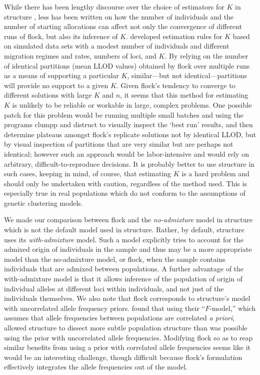 While there has been lengthy 
discourse over the choice of estimators for $K$ in {\sc structure} 
\citep{Pritchardetal2000,Evannoetal2005,Wap&Gag2006,Gaoetal2011}, less has been written on how the number of 
individuals
and the number of starting allocations can affect not only the convergence of different runs of {\sc flock}, but also its 
inference of $K$. \citeauthor{Duc&Tur2012} developed estimation rules for $K$ based on simulated data 
sets with a modest number of individuals and different migration regimes and rates, numbers of loci, and $K$. 
By relying on the number of identical partitions (mean LLOD values) obtained by {\sc flock} over multiple
runs as a means of supporting 
a particular $K$,  similar---but not identical---partitions
will provide no support to a given $K$. Given {\sc flock}'s tendency to converge to 
different solutions with large $K$ and $n$, it seems that 
this method for estimating $K$ is unlikely to be reliable or workable in large, complex
problems.  One possible patch for this problem would be running
multiple small batches and using the programs {\sc clumpp} \citep{Jak&Ros2007} and
{\sc distruct} \citep{Rosenberg2004} to visually inspect the `best run' results, and then 
determine plateaus amongst {\sc flock}'s replicate solutions not by identical LLOD, but by visual inspection of 
partitions that
are very similar but are perhaps not identical; however such an approach would be labor-intensive
and would rely on arbitrary, difficult-to-reproduce decisions.  It is probably better to use {\sc structure} in such cases, keeping in mind, of course, that
estimating $K$ is a hard problem and should only be undertaken with caution, regardless of the method 
used. This is especially true in real populations which do not conform to the assumptions of genetic clustering models.


We made our comparison between {\sc flock} and the {\em no-admixture} model in 
{\sc structure} which is not the default model used in {\sc structure}. Rather, by default, {\sc structure} uses 
its {\em with-admixture} model.  Such a model explicitly tries to account for the admixed origin
of individuals in the sample and thus may be a more appropriate model than the no-admixture model,
or {\sc flock}, when the sample contains individuals that are admixed between populations.  A further advantage
of the with-admixture model is that it allows inference of the population of origin of individual alleles at 
different loci within individuals, and not just of the individuals themselves.   We also note that {\sc flock} 
corresponds to {\sc structure}'s model with uncorrelated allele frequency priors. \citet{Falushetal2003} found that
using their ``$F$-model,'' which assumes that allele frequencies between populations are correlated {\em a priori}, 
allowed {\sc structure} to dissect more subtle population structure than was possible using the prior with
uncorrelated allele frequencies.  Modifying {\sc flock} so as to reap similar benefits from using a prior
with correlated allele frequencies seems like it would be an interesting challenge, though difficult
because {\sc flock}'s formulation effectively integrates the allele frequencies out of the model.
 


